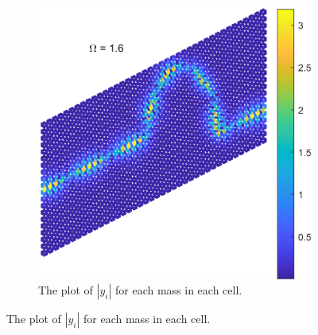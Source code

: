 \begin{figure}
\begin{subfigure}[b]{.5\textwidth}
  \includegraphics[width=1\linewidth]{imgs/curvedbendscat.png}
  \caption{The plot of $|y_i|$ for each mass in each cell.}
  \label{fig:sub2}
\end{subfigure}


\end{figure}

